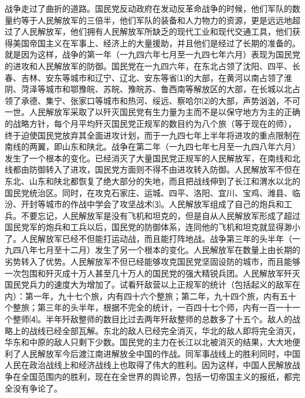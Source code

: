 \documentclass[UTF-8, a5paper, 12pt]{ctexart}
\begin{document}
战争走过了曲折的道路。国民党反动政府在发动反革命战争的时候，他们军队的数量约等于人民解放军的三倍半，他们军队的装备和人力物力的资源，更是远远地超过了人民解放军，他们拥有人民解放军所缺乏的现代工业和现代交通工具，他们获得美国帝国主义在军事上、经济上的大量援助，并且他们是经过了长期的准备的。就是因为这样，战争的第一年（一九四六年七月至一九四七年六月）表现为国民党的进攻和人民解放军的防御。国民党在一九四六年，在东北占领了沈阳、四平、长春、吉林、安东等城市和辽宁、辽北、安东等省⑴的大部，在黄河以南占领了淮阴、菏泽等城市和鄂豫皖、苏皖、豫皖苏、鲁西南等解放区的大部，在长城以北占领了承德、集宁、张家口等城市和热河、绥远、察哈尔⑵的大部，声势汹汹，不可一世。人民解放军采取了以歼灭国民党有生力量为主而不是以保守地方为主的正确的战略方针，每个月平均歼灭国民党正规军的数目约为八个旅（等于现在的师），终于迫使国民党放弃其全面进攻计划，而于一九四七年上半年将进攻的重点限制在南线的两翼，即山东和陕北。战争在第二年（一九四七年七月至一九四八年六月）发生了一个根本的变化。已经消灭了大量国民党正规军的人民解放军，在南线和北线都由防御转入了进攻，国民党方面则不得不由进攻转入防御。人民解放军不但在东北、山东和陕北都恢复了绝大部分的失地，而且把战线伸到了长江和渭水以北的国民党统治区。同时，在攻克石家庄、运城、四平、洛阳、宜川、宝鸡、潍县、临汾、开封等城市的作战中学会了攻坚战术⑶。人民解放军组成了自己的炮兵和工兵。不要忘记，人民解放军是没有飞机和坦克的，但是自从人民解放军形成了超过国民党军的炮兵和工兵以后，国民党的防御体系，连同他的飞机和坦克就显得渺小了。人民解放军已经不但能打运动战，而且能打阵地战。战争第三年的头半年（一九四八年七月至十二月）发生了另一个根本的变化。人民解放军在数量上由长期的劣势转入了优势。人民解放军不但已经能够攻克国民党坚固设防的城市，而且能够一次包围和歼灭成十万人甚至几十万人的国民党的强大精锐兵团。人民解放军歼灭国民党兵力的速度大为增加了。试看歼敌营以上正规军的统计（包括起义的敌军在内）：第一年，九十七个旅，内有四十六个整旅；第二年，九十四个旅，内有五十个整旅；第三年的头半年，根据不完全的统计，一百四十七个师，内有一百一十一个整师⑷。半年歼敌整师的数目比过去两年歼敌整师的总数多了十五个。敌人的战略上的战线已经全部瓦解。东北的敌人已经完全消灭，华北的敌人即将完全消灭，华东和中原的敌人只剩下少数。国民党的主力在长江以北被消灭的结果，大大地便利了人民解放军今后渡江南进解放全中国的作战。同军事战线上的胜利同时，中国人民在政治战线上和经济战线上也取得了伟大的胜利。因为这样，中国人民解放战争在全国范围内的胜利，现在在全世界的舆论界，包括一切帝国主义的报纸，都完全没有争论了。
\end{document}

